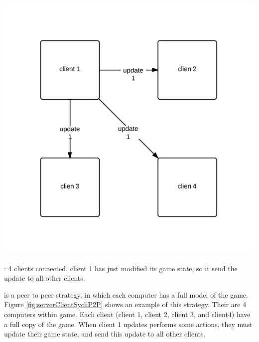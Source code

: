 \begin{marginfigure}
	\includegraphics{res/computer_communication_architecture/ServerClientSynchronizationP2P.png}
	\caption{
	\stepOneName : 4 clients connected. client 1 has just modified its game state, so it send the update to all other clients.
	}
	\label{fig:serverClientSychP2P}
\end{marginfigure}

\stepOneName is a peer to peer strategy, in which each computer has a full model of the game. Figure \ref{fig:serverClientSychP2P} shows an example of this strategy. 
Their are 4 computers within game. Each client (client 1, client 2, client 3, and client4) have a full copy of the game.
When client 1 updates performs some actions, they must update their game state, and send this update to all other clients.

